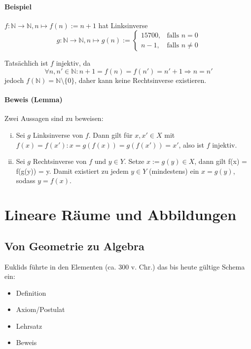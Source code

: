 \documentclass[12pt,a4paper,parskip=half-,DIV=15]{scrartcl}
\begin{document}
\paragraph{Beispiel} $ f:\mathbb{N}\to \mathbb{N}, n\mapsto f(n):= n+1 $ hat Linksinverse 
\begin{equation*}
g:\mathbb{N} \to \mathbb{N}, n\mapsto g(n):=
\begin{cases}
15700, & \text{falls } n=0\\
n-1, & \text{falls } n\neq 0
\end{cases} 
\end{equation*}

Tatsächlich ist $ f $ injektiv, da
\begin{equation*}
\forall n,n'\in \mathbb{N} : n+1 = f(n) = f(n') = n'+1 \Rightarrow n=n'
\end{equation*}
jedoch $ f(\mathbb{N}) = \mathbb{N}\setminus \{0\} $, daher kann keine Rechtsinverse existieren.

\paragraph{Beweis (Lemma)} Zwei Aussagen sind zu beweisen:
\begin{enumerate}[i)]
\item Sei $ g $ Linksinverse von $ f $. Dann gilt für $ x,x'\in X $ mit \\$ f(x) = f(x'): x = g(f(x)) = g(f(x')) = x' $, also ist $ f $ injektiv.
\item Sei $g $ Rechtsinverse von $ f $ und $ y\in Y $. Setze $ x:= g(y)\in X $, dann gilt f(x) = f(g(y)) = y. Damit existiert zu jedem $ y\in Y $ (mindestens) ein $ x = g(y) $, sodass  $ y=f(x) $.
\end{enumerate}


\section{Lineare Räume und Abbildungen}
\subsection{Von Geometrie zu Algebra}
Euklids führte in den \glqq Elementen\grqq{} (ca. 300 v. Chr.) das bis heute gültige Schema ein:
\begin{itemize}
\item Definition
\item Axiom/Postulat
\item Lehrsatz
\item Beweis
\end{itemize}
\end{document}
